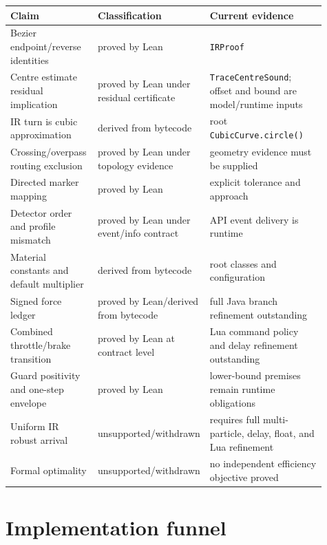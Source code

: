 \documentclass[10pt,a4paper]{article}
\newcommand{\Lean}[1]{\texttt{#1}}
\begin{document}
\begin{longtable}{p{0.29\linewidth}p{0.23\linewidth}p{0.39\linewidth}}
\toprule
Claim & Classification & Current evidence \\
\midrule
Bezier endpoint/reverse identities & proved by Lean & \Lean{IRProof} \\
Centre estimate residual implication & proved by Lean under residual certificate & \Lean{TraceCentreSound}; offset and bound are model/runtime inputs \\
IR turn is cubic approximation & derived from bytecode & root \texttt{CubicCurve.circle()} \\
Crossing/overpass routing exclusion & proved by Lean under topology evidence & geometry evidence must be supplied \\
Directed marker mapping & proved by Lean & explicit tolerance and approach \\
Detector order and profile mismatch & proved by Lean under event/info contract & API event delivery is runtime \\
Material constants and default multiplier & derived from bytecode & root classes and configuration \\
Signed force ledger & proved by Lean/derived from bytecode & full Java branch refinement outstanding \\
Combined throttle/brake transition & proved by Lean at contract level & Lua command policy and delay refinement outstanding \\
Guard positivity and one-step envelope & proved by Lean & lower-bound premises remain runtime obligations \\
Uniform IR robust arrival & unsupported/withdrawn & requires full multi-particle, delay, float, and Lua refinement \\
Formal optimality & unsupported/withdrawn & no independent efficiency objective proved \\
\bottomrule
\end{longtable}

\section{Implementation funnel}
\end{document}
